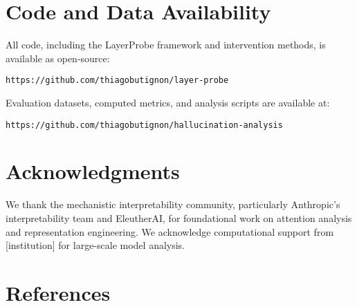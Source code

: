 \documentclass[11pt]{article}
\begin{document}
\section*{Code and Data Availability}

All code, including the LayerProbe framework and intervention methods, is available as open-source:

\texttt{https://github.com/thiagobutignon/layer-probe}

Evaluation datasets, computed metrics, and analysis scripts are available at:

\texttt{https://github.com/thiagobutignon/hallucination-analysis}

\section*{Acknowledgments}

We thank the mechanistic interpretability community, particularly Anthropic's interpretability team and EleutherAI, for foundational work on attention analysis and representation engineering. We acknowledge computational support from [institution] for large-scale model analysis.

\section*{References}
\end{document}
